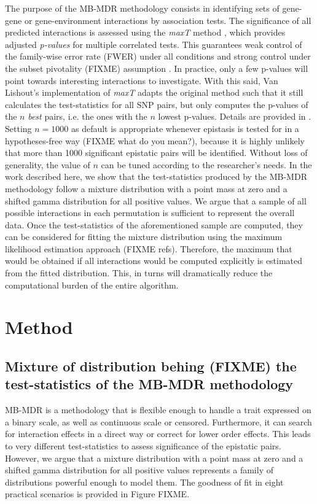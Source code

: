 \documentclass{bmcart}
\begin{document}
The purpose of the MB-MDR methodology consists in identifying sets of gene-gene or gene-environment interactions by association tests. The significance of all predicted interactions is assessed using the {\em maxT} method \cite{Westfall1993}, which provides adjusted\emph{ p-values }for multiple correlated tests. This guarantees weak control of the family-wise error rate (FWER) under all conditions and strong control under the subset pivotality (FIXME) assumption \cite{Ge2003}. In practice, only a few p-values will point towards interesting interactions to investigate. With this said, Van Lishout's implementation of {\em maxT} adapts the original method such that it still calculates the test-statistics for all SNP pairs, but only computes the p-values of the $n$ \emph{best} pairs, i.e. the ones with the $n$ lowest p-values. Details are provided in  \cite{VanLishout2013}. Setting $n = 1000$ as default is appropriate whenever epistasis is tested for in a hypotheses-free way (FIXME what do you mean?), because it is highly unlikely that more than 1000 significant epistatic pairs will be identified. Without loss of generality, the value of $n$ can be tuned according to the researcher's needs. 
In the work described here, we show that the test-statistics produced by the MB-MDR methodology follow a mixture distribution with a point mass at zero and a shifted gamma distribution for all positive values. We argue that a sample of all possible interactions in each permutation is sufficient to represent the overall data. 
Once the test-statistics of the aforementioned sample are computed, they can be considered for fitting the mixture distribution using the maximum likelihood estimation approach (FIXME refs). Therefore, the maximum that would be obtained if all interactions would be computed explicitly is estimated from the fitted distribution. This, in turns will dramatically reduce the computational burden of the entire algorithm.

\section*{Method}
\subsection*{Mixture of distribution behing (FIXME) the test-statistics of the MB-MDR methodology}
MB-MDR is a methodology that is flexible enough to handle a trait expressed on a binary scale, as well as continuous scale or censored. Furthermore, it can search for interaction effects in a direct way or correct for lower order effects. This leads to very different test-statistics to assess significance of the epistatic pairs. However, we argue that a mixture distribution with a point mass at zero and a shifted gamma distribution for all positive values represents a family of distributions powerful enough to model them. The goodness of fit in eight practical scenarios is provided in Figure FIXME. 
\end{document}
